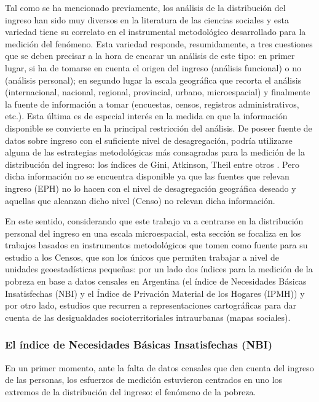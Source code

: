 Tal como se ha mencionado previamente, los análisis de la distribución del ingreso han sido muy diversos en la literatura de las ciencias sociales y esta variedad tiene su correlato en el instrumental metodológico desarrollado para la medición del fenómeno. Esta variedad responde, resumidamente, a tres cuestiones que se deben precisar a la hora de encarar un análisis de este tipo: en primer lugar, si ha de tomarse en cuenta el origen del ingreso (análisis funcional) o no (análisis personal); en segundo lugar la escala geográfica que recorta el análisis (internacional, nacional, regional, provincial, urbano, microespacial) y finalmente la fuente de información a tomar (encuestas, censos, registros administrativos, etc.). Esta última es de especial interés en la medida en que la información disponible se convierte en la principal restricción del análisis. De poseer fuente de datos sobre ingreso con el suficiente nivel de desagregación, podría utilizarse alguna de las estrategias metodológicas más consagradas para la medición de la distribución del ingreso: los índices de Gini, Atkinson, Theil entre otros \cite{worldbank}. Pero dicha información no se encuentra disponible ya que las fuentes que relevan ingreso (EPH) no lo hacen con el nivel de desagregación geográfica deseado y aquellas que alcanzan dicho nivel (Censo) no relevan dicha información.

En este sentido, considerando que este trabajo va a centrarse en la distribución personal del ingreso en una escala microespacial, esta sección se focaliza en los trabajos basados en instrumentos metodológicos que tomen como fuente para su estudio a los Censos, que son los únicos que permiten trabajar a nivel de unidades geoestadísticas pequeñas: por un lado dos índices para la medición de la pobreza en base a datos censales en Argentina (el índice de Necesidades Básicas Insatisfechas (NBI) y el Índice de Privación Material de los Hogares (IPMH)) y por otro lado, estudios que recurren a representaciones cartográficas para dar cuenta de las desigualdades socioterritoriales intraurbanas (mapas sociales).


\subsubsection{El índice de Necesidades Básicas Insatisfechas (NBI)}


En un primer momento, ante la falta de datos censales que den cuenta del ingreso de las personas, los esfuerzos de medición estuvieron centrados en uno los extremos de la distribución del ingreso: el fenómeno de la pobreza.

